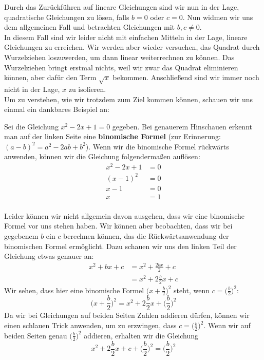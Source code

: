 \documentclass[../../main.tex]{subfiles}
\begin{document}
Durch das Zurückführen auf lineare Gleichungen sind wir nun in der Lage, quadratische Gleichungen zu lösen, falls $b=0$ oder $c=0$. Nun widmen wir uns dem allgemeinen Fall und betrachten Gleichungen mit $b,c\neq0$.\\
In diesem Fall sind wir leider nicht mit einfachen Mitteln in der Lage, lineare Gleichungen zu erreichen. Wir werden aber wieder versuchen, das Quadrat durch Wurzelziehen loszuwerden, um dann linear weiterrechnen zu können. Das Wurzelziehen bringt erstmal nichts, weil wir zwar das Quadrat eliminieren können, aber dafür den Term $\sqrt{x}$ bekommen. Anschließend sind wir immer noch nicht in der Lage, $x$ zu isolieren.\\
Um zu verstehen, wie wir trotzdem zum Ziel kommen können, schauen wir uns einmal ein dankbares Beispiel an:
\begin{example}
Sei die Gleichung $x^2-2x+1=0$ gegeben. Bei genauerem Hinschauen erkennt man auf der linken Seite eine \textbf{binomische Formel} (zur Erinnerung: $(a-b)^2=a^2-2ab+b^2$). Wenn wir die binomische Formel rückwärts anwenden, können wir die Gleichung folgendermaßen auflösen:
\begin{equation*}\begin{split}
x^2-2x+1&=0\\
(x-1)^2&=0\\
x-1&=0\\
x&=1\\
\end{split}\end{equation*}
\end{example}
Leider können wir nicht allgemein davon ausgehen, dass wir eine binomische Formel vor uns stehen haben. Wir können aber beobachten, dass wir bei gegebenem $b$ ein $c$ berechnen können, das die Rückwärtsanwendung der binomischen Formel ermöglicht. Dazu schauen wir uns den linken Teil der Gleichung etwas genauer an:
\begin{equation*}\begin{split}
    x^2+bx+c&=x^2+\frac{2bx}{2}+c\\
    &=x^2+2\frac{b}{2}x+c
\end{split}\end{equation*}
\noindent Wir sehen, dass hier eine binomische Formel $\Big(x+\frac{b}{2}\Big)^2$ steht, wenn $c=\Big(\frac{b}{2}\Big)^2$:
\[\Big(x+\frac{b}{2}\Big)^2=x^2+2\frac{b}{2}x+\Big(\frac{b}{2}\Big)^2\]
\noindent Da wir bei Gleichungen auf beiden Seiten Zahlen addieren dürfen, können wir einen schlauen Trick anwenden, um zu erzwingen, dass $c=\Big(\frac{b}{2}\Big)^2$. Wenn wir auf beiden Seiten genau $\Big(\frac{b}{2}\Big)^2$ addieren, erhalten wir die Gleichung \[x^2+2\frac{b}{2}x+c+\Big(\frac{b}{2}\Big)^2=\Big(\frac{b}{2}\Big)^2\]
\end{document}

